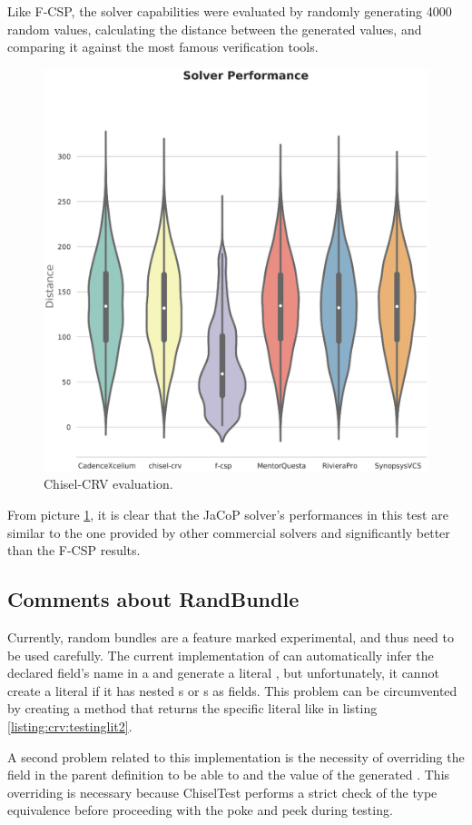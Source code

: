 Like F-CSP, the solver capabilities were evaluated by randomly generating 4000
random values, calculating the distance between the generated values, and
comparing it against the most famous verification tools.

\begin{figure}
\centering
\includegraphics[width=0.7\linewidth]{pictures/Chisel-CRV_performance.eps}
\caption{Chisel-CRV evaluation.}
\label{fig:chiselcrv:distance}
\end{figure}

From picture \ref{fig:chiselcrv:distance}, it is clear that the JaCoP solver's
performances in this test are similar to the one provided by other commercial
solvers and significantly better than the F-CSP results.

\subsection{Comments about RandBundle}
Currently, random bundles are a feature marked experimental, and thus need to be
used carefully. The current implementation of  can automatically
infer the declared field's name in a  and generate a literal
, but unfortunately, it cannot create a literal  if
it has nested s or s as fields. This problem can be
circumvented by creating a method that returns the specific literal
 like in listing \ref{listing:crv:testinglit2}.

A second problem related to this implementation is the necessity of overriding
the  field in the parent  definition to be
able to  and  the value of the generated .
This overriding is necessary because ChiselTest performs a strict check of the
type equivalence before proceeding with the poke and peek during testing.

